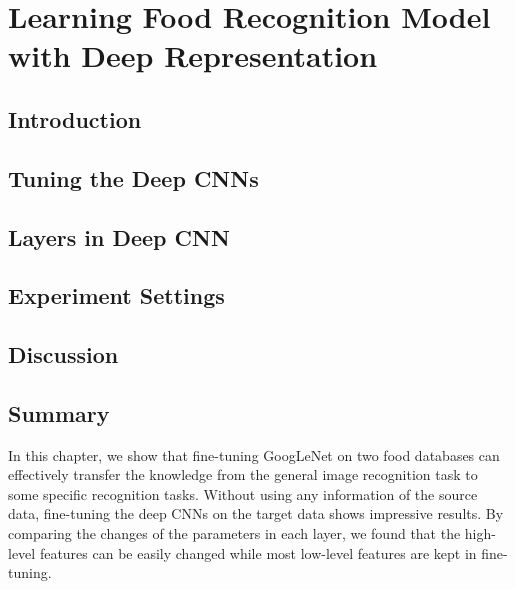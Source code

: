 \chapter{Learning Food Recognition Model with Deep Representation}\label{sec:cnn}

\section{Introduction}


\section{Tuning the Deep CNNs}


\section{Layers in Deep CNN}

\section{Experiment Settings}

\section{Discussion}

\section{Summary}
In this chapter, we show that fine-tuning GoogLeNet on two food databases can effectively transfer the knowledge from the general image recognition task to some specific recognition tasks. Without using any information of the source data, fine-tuning the deep CNNs on the target data shows impressive results. By comparing the changes of the parameters in each layer, we found that the high-level features can be easily changed while most low-level features are kept in fine-tuning.